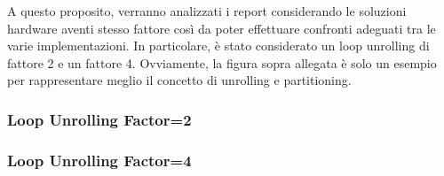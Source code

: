 A questo proposito, verranno analizzati i report considerando le soluzioni hardware aventi stesso fattore così da poter effettuare confronti adeguati tra le varie implementazioni. In particolare, è stato considerato un loop unrolling di fattore 2 e un fattore 4. Ovviamente, la figura sopra allegata è solo un esempio per rappresentare meglio il concetto di unrolling e partitioning.

\subsubsection{Loop Unrolling Factor=2}


\newpage

\subsubsection{Loop Unrolling Factor=4}

